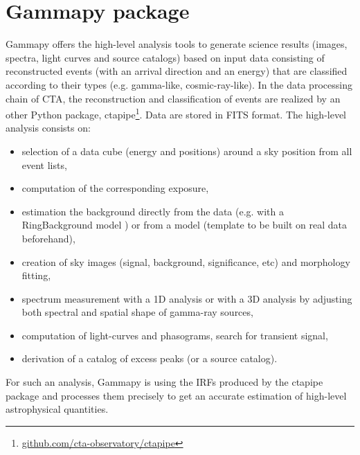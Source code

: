 \documentclass{PoS}
\newcommand{\urlCtaPipe}{\href{https://github.com/cta-observatory/ctapipe}{github.com/cta-observatory/ctapipe}}
\begin{document}


\section{Gammapy package}
\label{sec:package}

Gammapy offers the high-level analysis tools to generate science results (images, spectra,
light curves and source catalogs) based on input data consisting of 
reconstructed events (with an arrival direction and an energy) that are 
classified according to their types (e.g. gamma-like, cosmic-ray-like). 
In the data processing chain of CTA, the reconstruction and classification 
of events are realized by an other Python package, ctapipe\footnote{\urlCtaPipe}. Data are stored in FITS format. 
The high-level analysis consists on: 
\vspace{-0.3cm}
\begin{itemize}
\setlength\itemsep{-0.5em}
\item selection of a data cube (energy and positions) around a sky position from all event
lists,
\item computation of the corresponding exposure,
\item estimation the background directly from the data (e.g. with a RingBackground model \cite{berge}) 
or from a model (template to be built on real data beforehand),
\item creation of sky images (signal, background, significance, etc) and morphology fitting,
\item spectrum measurement with a 1D analysis or with a 3D analysis by adjusting both spectral and spatial shape of gamma-ray sources,
\item computation of light-curves and phasograms, search for transient signal,
\item derivation of a catalog of excess peaks (or a source catalog).

\end{itemize}
\vspace{-0.28cm}
For such an analysis, Gammapy is using the IRFs produced by the ctapipe  package and 
processes them precisely to get an accurate estimation of high-level astrophysical quantities.
\end{document}

